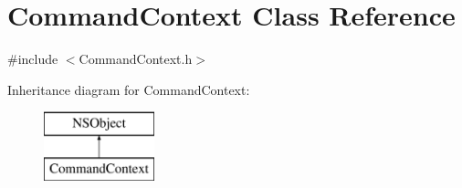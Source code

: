 \hypertarget{interface_command_context}{
\section{\-Command\-Context \-Class \-Reference}
\label{interface_command_context}
}


{\ttfamily \#include $<$\-Command\-Context.\-h$>$}

\-Inheritance diagram for \-Command\-Context\-:\begin{figure}[H]
\begin{center}
\leavevmode
\includegraphics[height=2.000000cm]{interface_command_context}
\end{center}
\end{figure}
